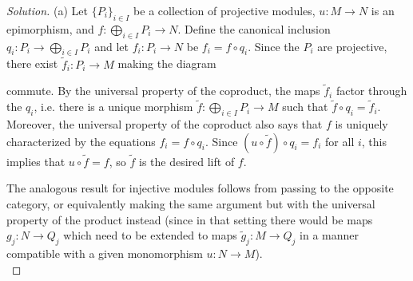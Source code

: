 \documentclass[10pt]{article}
\newenvironment{soln}{\begin{proof}[Solution]}{\end{proof}}
\begin{document}
\begin{soln}
    (a) Let $\{P_i\}_{i\in I}$ be a collection of projective modules,
    $u\colon M\to N$ is an epimorphism, and
    $f\colon\bigoplus_{i\in I}P_i\to N$.
    Define  the canonical inclusion $q_i\colon P_i\to\bigoplus_{i\in I} P_i$
    and let $f_i\colon P_i\to N$ be $f_i = f\circ q_i$.
    Since the $P_i$ are projective, there exist $\tilde f_i\colon P_i\to M$
    making the diagram
    \begin{center}
    \end{center}
    commute. By the universal property of the coproduct,
    the maps $\tilde f_i$ factor through the $q_i$,
    i.e. there is a unique morphism
    $\tilde f\colon\bigoplus_{i\in I}P_i\to M$ such that
    $\tilde f\circ q_i = \tilde f_i$.
    Moreover, the universal property of the coproduct also says that $f$
    is uniquely characterized by the equations $f_i = f\circ q_i$.
    Since $(u\circ\tilde f)\circ q_i = f_i$ for all $i$,
    this implies that $u\circ\tilde f = f$, so $\tilde f$
    is the desired lift of $f$.

    The analogous result for injective modules follows
    from passing to the opposite category,
    or equivalently making the same argument but with
    the universal property of the product instead
    (since in that setting there would be maps $g_j\colon N\to Q_j$
    which need to be extended to maps $\tilde g_j\colon M\to Q_j$
    in a manner compatible with a given monomorphism $u\colon N\to M$).
    \\


\end{soln}
\end{document}

